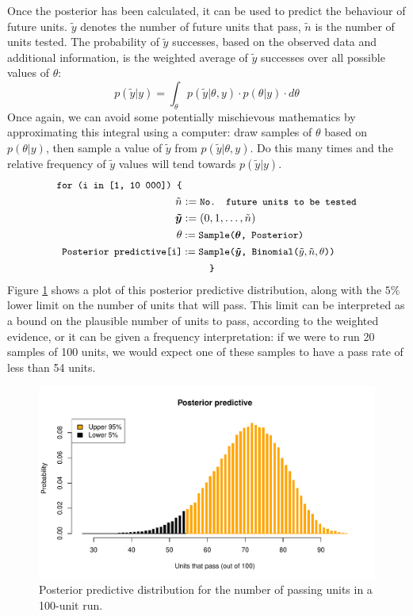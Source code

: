 \documentclass[11pt,a4paper,article]{memoir} %
\begin{document}
\par
Once the posterior has been calculated, it can be used to predict the behaviour of future units. $\tilde{y}$ denotes the number of future units that pass, $\tilde{n}$ is the number of units tested. The probability of $\tilde{y}$ successes, based on the observed data and additional information, is the weighted average of $\tilde{y}$ successes over all possible values of $\theta$:
\begin{equation}
	p(\tilde{y}|y) = \int_{\theta}p(\tilde{y}|\theta, y)\cdot p(\theta|y) \cdot d\theta
\end{equation}
Once again, we can avoid some potentially mischievous mathematics by approximating this integral using a computer: draw samples of $\theta$ based on $p(\theta|y)$, then sample a value of $\tilde{y}$ from $p(\tilde{y}|\theta, y)$. Do this many times and the relative frequency of $\tilde{y}$ values will tend towards $p(\tilde{y}|y)$.
\begin{align}
\small{\texttt{for (i in [1, 10 000]) \{}} &\\
	\tilde{n} &:= \small{\texttt{No. future units to be tested}} \\
	\boldsymbol{\tilde{y}} &:= (0, 1, \dots, \tilde{n}) \\
	\theta &:= \small{\texttt{Sample(}}\boldsymbol{\theta}\small{\texttt{, Posterior)}} \\
	\small{\texttt{Posterior predictive[i]}} &:= \small{\texttt{Sample(}}\boldsymbol{\tilde{y}}\small{\texttt{, Binomial(}}\tilde{y}, \tilde{n}, \theta\small{\texttt{))}}\\
	&\quad\quad \small{\texttt{ \} }}
\end{align}
Figure \ref{fig:posterior_predictive} shows a plot of this posterior predictive distribution, along with the $5\%$ lower limit on the number of units that will pass. This limit can be interpreted as a bound on the plausible number of units to pass, according to the weighted evidence, or it can be given a frequency interpretation: if we were to run 20 samples of 100 units, we would expect one of these samples to have a pass rate of less than 54 units.
\begin{figure}
\includegraphics[width=\textwidth]{posterior_predictive.pdf}
\caption{Posterior predictive distribution for the number of passing units in a 100-unit run.}
\label{fig:posterior_predictive}
\end{figure}
\end{document}
